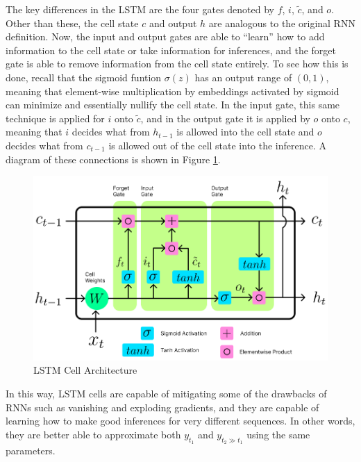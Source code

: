\documentclass{scrartcl}
\begin{document}
The key differences in the LSTM are the four gates denoted by $f$, $i$,
$\tilde{c}$, and $o$. Other than these, the cell state $c$ and output $h$ are
analogous to the original RNN definition. Now, the input and output gates are
able to ``learn'' how to add information to the cell state or take information
for inferences, and the forget gate is able to remove information from the cell
state entirely. To see how this is done, recall that the sigmoid funtion
$\sigma (z)$ has an output range of $(0, 1)$, meaning that element-wise
multiplication by embeddings activated by sigmoid can minimize and essentially
nullify the cell state. In the input gate, this same technique is applied for
$i$ onto $\tilde{c}$, and in the output gate it is applied by $o$ onto $c$,
meaning that $i$ decides what from $h_{t - 1}$ is allowed into the cell state
and $o$ decides what from $c_{t - 1}$ is allowed out of the cell state into the
inference. A diagram of these connections is shown in Figure
\ref{fig:lstmcell_arch}.

\begin{figure}[H]
	\begin{center}
		\includegraphics[width=1\textwidth]{figures/lstmcell_arch.png}
	\end{center}
	\caption{LSTM Cell Architecture}
	\label{fig:lstmcell_arch}
\end{figure}

In this way, LSTM cells are capable of mitigating some of the drawbacks of RNNs
such as vanishing and exploding gradients, and they are capable of learning how
to make good inferences for very different sequences. In other words, they are
better able to approximate both $y_{t_1}$ and $y_{t_2 \gg t_1}$ using the same
parameters.
\end{document}

